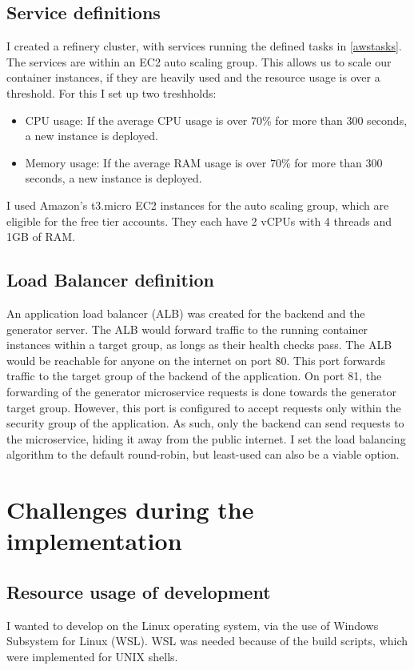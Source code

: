 		\subsection{Service definitions} \label{awsservices}
			I created a refinery cluster, with services running the defined tasks in \ref{awstasks}. The services are within an 
			EC2 auto scaling group. 
			This allows us to scale our container instances, if they are heavily used and the resource usage is over a threshold.
			For this I set up two treshholds:
			\begin{itemize}
				\item CPU usage: If the average CPU usage is over 70\% for more than 300 seconds, a new instance is deployed.
				\item Memory usage: If the average RAM usage is over 70\% for more than 300 seconds, a new instance is deployed.
			\end{itemize}
			I used Amazon's t3.micro EC2 instances for the auto scaling group, which are eligible for the free tier accounts. 
			They each have 2 vCPUs with 4 threads and 1GB of RAM.
		
		\subsection{Load Balancer definition} \label{awslb}
			An application load balancer (ALB) was created for the 
			backend and the generator server. The ALB would forward traffic to the running container instances within a target group, as longs as their
			health checks pass. 
			The ALB would be reachable for anyone on the internet on port 80. This port forwards traffic to the target group of the backend of the application.
			On port 81, the forwarding of the generator microservice requests is done towards the generator target group. However, this port is configured
			to accept requests only within the security group of the application. As such, only the backend can send requests to the microservice, hiding it 
			away from the public internet.
			I set the load balancing algorithm to the default round-robin, but least-used can also be a viable option.

	\section{Challenges during the implementation} \label{challenges}
	\subsection{Resource usage of development}
		I wanted to develop on the Linux operating system, via the use of Windows Subsystem for Linux (WSL). WSL was needed because 
		of the build scripts, which were implemented for UNIX shells.

